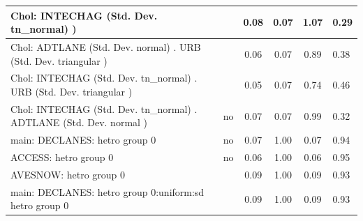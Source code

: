 \begin{table}
\begin{center}
\begin{tabular}{|l|l|c|c|c|l|}
			\hline
			 Chol: INTECHAG (Std. Dev. tn_normal) ) &  & 0.08 & 0.07 & 1.07 & 0.29 \\
			\hline
			 Chol: ADTLANE (Std. Dev. normal) . URB (Std. Dev.   triangular ) &  & 0.06 & 0.07 & 0.89 & 0.38 \\
			\hline
			 Chol: INTECHAG (Std. Dev. tn_normal) . URB (Std. Dev.   triangular ) &  & 0.05 & 0.07 & 0.74 & 0.46 \\
			\hline
			 Chol: INTECHAG (Std. Dev. tn_normal) . ADTLANE (Std. Dev.   normal ) & no & 0.07 & 0.07 & 0.99 & 0.32 \\
			\hline
			main: DECLANES: hetro group 0 & no & 0.07 & 1.00 & 0.07 & 0.94 \\
			\hline
			ACCESS: hetro group 0 & no & 0.06 & 1.00 & 0.06 & 0.95 \\
			\hline
			AVESNOW: hetro group 0 &  & 0.09 & 1.00 & 0.09 & 0.93 \\
			\hline
			main: DECLANES: hetro group 0:uniform:sd  hetro group 0 &  & 0.09 & 1.00 & 0.09 & 0.93 \\
			\hline
		\end{tabular}
	\end{center}
\end{table}